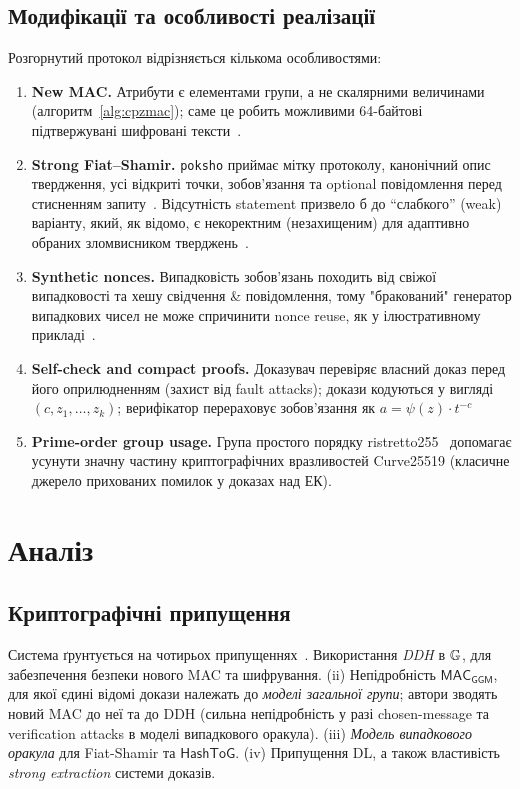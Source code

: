 \subsection{Модифікації та особливості реалізації}
Розгорнутий протокол відрізняється кількома особливостями:
\begin{enumerate}
  \item \textbf{New MAC.} Атрибути є елементами групи, а не скалярними величинами (алгоритм~\ref{alg:cpzmac}); 
    саме це робить можливими 64-байтові підтвержувані шифровані тексти~\cite{CPZ20}.
  \item \textbf{Strong Fiat--Shamir.} \texttt{poksho} приймає мітку протоколу, канонічний опис твердження, усі 
    відкриті точки, зобов'язання та optional повідомлення перед стисненням запиту~\cite{libsignal}. Відсутність 
    statement призвело б до \enquote{слабкого} (weak) варіанту, який, як відомо, є некоректним (незахищеним) 
    для адаптивно обраних зломвисником тверджень~\cite{BPW12}.
  \item \textbf{Synthetic nonces.} Випадковість зобов'язань походить від свіжої випадковості та хешу свідчення 
    \& повідомлення, тому "бракований"{} генератор випадкових чисел не може спричинити nonce reuse, як у ілюстративному 
    прикладі~\cite{libsignal}.
  \item \textbf{Self-check and compact proofs.} Доказувач перевіряє власний доказ перед його оприлюдненням (захист
    від fault attacks); докази кодуються у вигляді $(c, z_1, \dots, z_k)$; верифікатор перераховує зобов'язання 
    як $a=\psi(z)\cdot t^{-c}$~\cite{libsignal}
  \item \textbf{Prime-order group usage.} Група простого порядку ristretto255~\cite{RFC9496} допомагає усунути 
    значну частину криптографічних вразливостей Curve25519 (класичне джерело прихованих помилок у доказах над ЕК).
\end{enumerate}

\section{Аналіз}
\label{sec:analysis}

\subsection{Криптографічні припущення}
Система ґрунтується на чотирьох припущеннях~\cite{CPZ20}. Використання \emph{DDH} в $\mathbb{G}$, для забезпечення безпеки 
нового MAC та шифрування. (ii) Непідробність $\mathsf{MAC}_{\mathsf{GGM}}$, для якої єдині відомі докази належать 
до \emph{моделі загальної групи}; автори зводять новий MAC до неї та до DDH (сильна непідробність у разі chosen-message 
та verification attacks в моделі випадкового оракула). (iii) \emph{Модель випадкового оракула} для Fiat-Shamir 
та $\mathsf{HashToG}$. (iv) Припущення DL, а також властивість \emph{strong extraction} системи доказів.

